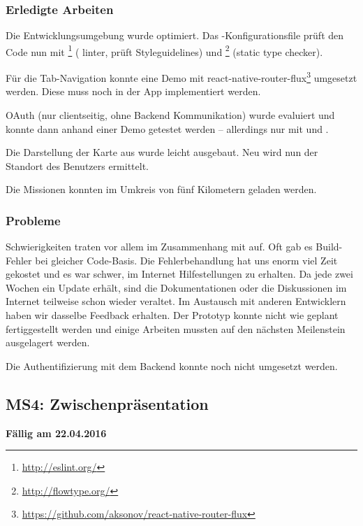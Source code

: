 \subsubsection{Erledigte Arbeiten}
Die Entwicklungsumgebung wurde optimiert. Das -Konfigurationsfile prüft den Code nun mit \footnote{\url{http://eslint.org/}} ( linter, prüft Styleguidelines) und \footnote{\url{http://flowtype.org/}} (static type checker). 

Für die Tab-Navigation konnte eine Demo mit react-native-router-flux\footnote{\url{https://github.com/aksonov/react-native-router-flux}} umgesetzt werden. Diese muss noch in der \kort{} App implementiert werden. 

\gls{OAuth} (nur clientseitig, ohne Backend Kommunikation) wurde evaluiert und konnte dann anhand einer Demo getestet werden -- allerdings nur mit  und .

Die Darstellung der Karte aus  wurde leicht ausgebaut. Neu wird nun der Standort des Benutzers ermittelt.

Die Missionen konnten im Umkreis von fünf Kilometern geladen werden.

\subsubsection{Probleme}
Schwierigkeiten traten vor allem im Zusammenhang mit  auf.
Oft gab es Build-Fehler bei gleicher Code-Basis.
Die Fehlerbehandlung hat uns enorm viel Zeit gekostet und es war schwer, im Internet Hilfestellungen zu erhalten.
Da  jede zwei Wochen ein Update erhält, sind die Dokumentationen oder die Diskussionen im Internet teilweise schon wieder veraltet.\newline
Im Austausch mit anderen  Entwicklern haben wir dasselbe Feedback erhalten.\newline
Der Prototyp konnte nicht wie geplant fertiggestellt werden und einige Arbeiten mussten auf den nächsten Meilenstein ausgelagert werden.

Die Authentifizierung mit dem Backend konnte noch nicht umgesetzt werden.

\subsection{MS4: Zwischenpräsentation}
\label{pm-ms4}
\textbf{Fällig am 22.04.2016}

